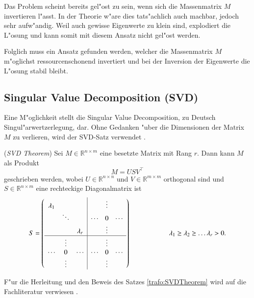 \begin{refsection}
Das Problem scheint bereits gel"ost zu sein, wenn sich die Massenmatrix $M$ invertieren l"asst. In der Theorie w"are dies tats"achlich auch machbar, jedoch sehr aufw"andig. Weil auch gewisse Eigenwerte zu klein sind, explodiert die L"osung und kann somit mit diesem Ansatz nicht gel"ost werden.

Folglich muss ein Ansatz gefunden werden, welcher die Massenmatrix $M$ m"oglichst ressourcenschonend invertiert und bei der Inversion der Eigenwerte die L"osung stabil bleibt. 


\subsection{Singular Value Decomposition (SVD) }
Eine M"oglichkeit stellt die Singular Value Decomposition, zu Deutsch Singul"arwertzerlegung, dar. Ohne Gedanken "uber die Dimensionen der Matrix $M$ zu verlieren, wird der SVD-Satz verwendet \cite{trafo:Watkins}. 

\begin{satz}
	\label{trafo:SVDTheorem}
	(\textit{SVD Theorem}) Sei $M\in \mathbb{R}^{n \times m}$ eine besetzte Matrix mit Rang $r$. Dann kann $M$ als Produkt
	\begin{equation}
		M = USV^\top
		\label{trafo:svd}
	\end{equation} 
	geschrieben werden, wobei $U \in \mathbb{R}^{n \times n}$ und $V \in \mathbb{R}^{m \times m}$ orthogonal sind und $S \in \mathbb{R}^{n \times m}$ eine rechteckige Diagonalmatrix ist 
	\begin{equation*}
		S = \left( 
			\begin{array}{ccc|ccc}
				\lambda_1 &          &          &        & \vdots &        \\
				& \ddots   &          & \cdots & 0      & \cdots \\
				&          & \lambda_r &        & \vdots &        \\
				\hline
				&  \vdots  &          &        & \vdots &        \\
				\cdots   &  0       & \cdots   & \cdots & 0      & \cdots \\
				&  \vdots  &          &        & \vdots &   \\				
				\end{array}
			\right) 
			\hspace{2cm}\lambda_1 \geq \lambda_2 \geq \dots \lambda_r > 0. 
	\end{equation*}
\end{satz}
F"ur die Herleitung und den Beweis des Satzes \ref{trafo:SVDTheorem} wird auf die Fachliteratur verwiesen \cite{trafo:Watkins}.


\end{refsection}
